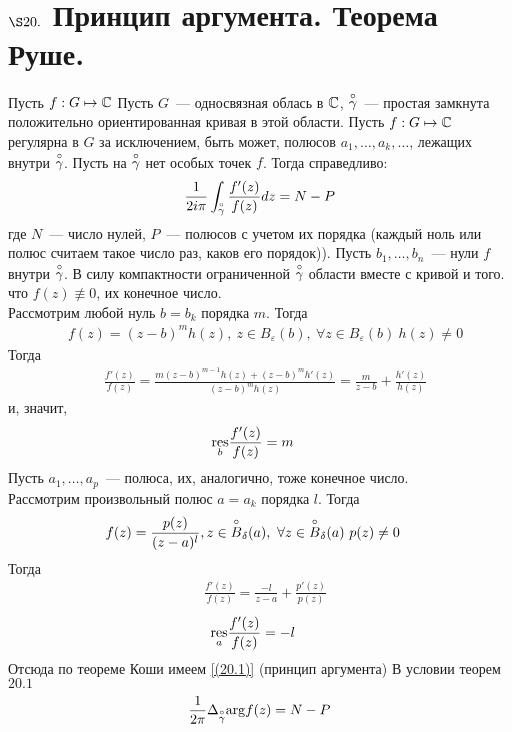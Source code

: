 \section{$\S 20.$ Принцип аргумента. Теорема Руше.}
\theorem
Пусть $f: G \mapsto \mathbb{C}$
Пусть $G$~--- односвязная облась в $\mathbb{C}$, $\overset{\circ}{\gamma}$~--- простая замкнута
положительно ориентированная кривая в этой области. Пусть $f: G \mapsto \mathbb{C}$
регулярна в $G$ за исключением, быть может, полюсов $a_1, \dots, a_k, \dots$,
лежащих внутри $\overset{\circ}{\gamma}$. Пусть на $\overset{\circ}{\gamma}$ нет особых точек $f$. Тогда
справедливо:
\begin{equation}\label{(20.1)}
    \frac{1}{2 i \pi}\int_{\overset{\circ}{\gamma}} \frac{f'(z)}{f(z)}dz = N - P
\end{equation}
где $N$~--- число нулей, $P$~--- полюсов с учетом их порядка (каждый ноль или
полюс считаем такое число раз, каков его порядок)).
\pr
Пусть $b_1, \dots, b_n$~--- нули $f$ внутри $\overset{\circ}{\gamma}$. В силу компактности
ограниченной $\overset{\circ}{\gamma}$ области вместе с кривой и того. что $f(z) \not \equiv 0$,
их конечное число.
\\
Рассмотрим любой нуль $b = b_k$ порядка $m$. Тогда
\begin{align*}
  & f(z) = (z-b)^mh(z), \ z \in B_\varepsilon(b), \ \forall z \in B_\varepsilon(b) \ h(z) \neq 0
\end{align*}
Тогда
\begin{align*}
  & \frac{f'(z)}{f(z)} = \frac{m(z-b)^{m-1}h(z)+(z-b)^mh'(z)}{(z-b)^mh(z)} = \frac{m}{z-b} + \frac{h'(z)}{h(z)}
\end{align*}
и, значит,
\begin{align*}
  & \underset{b}{\mathrm{res}}\frac{f'(z)}{f(z)} = m
\end{align*}
Пусть $a_1, \dots, a_p$~--- полюса, их, аналогично, тоже конечное число.
\\
Рассмотрим произвольный полюс $a = a_k$ порядка $l$. Тогда
\begin{align*}
& f(z) = \frac{p(z)}{(z-a)^l}, z \in \os{\circ}{B}_\delta(a), \ \forall z \in \os{\circ}{B}_\delta
(a) \ p(z)\neq 0
\end{align*}
Тогда
\begin{align*}
  & \frac{f'(z)}{f(z)} = \frac{-l}{z-a} + \frac{p'(z)}{p(z)}
\end{align*}
\begin{align*}
  & \underset{a}{\mathrm{res}}\frac{f'(z)}{f(z)} = -l
\end{align*}
Отсюда по теореме Коши имеем \eqref{(20.1)}
\corollary (принцип аргумента)
В условии теорем $20.1$
\begin{equation}\label{(20.2)}
  \frac{1}{2\pi} \Delta_{\overset{\circ}{\gamma}}\mathrm{arg} f(z) = N - P
\end{equation}
